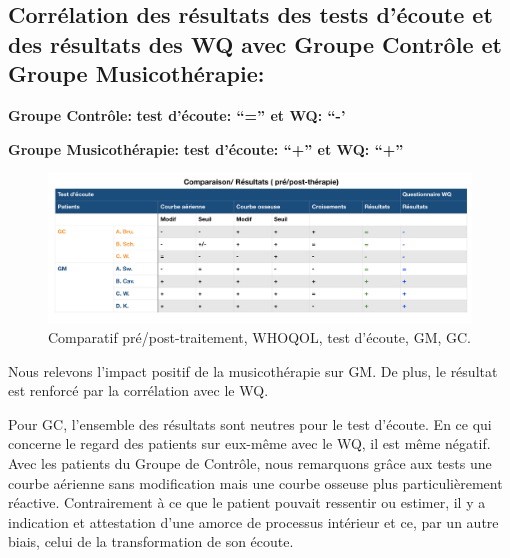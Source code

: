   \subsection{Corrélation des résultats des tests d'écoute et des
    résultats des WQ avec Groupe Contrôle et
    Groupe Musicothérapie:}
\textbf{Groupe Contrôle:} 	          \textbf{ test d'écoute: ``=''   et    WQ: ``-'}

 
\textbf{Groupe Musicothérapie:}     \textbf{test d'écoute: ``+''      et    WQ: ``+''}


 \begin{figure}[th]
\centering
\includegraphics[width=1\linewidth]{images/graphiques/comparaison_pre_post.png}
\caption[Corrélation résultats pré/post]{Comparatif
  pré/post-traitement, WHOQOL, test d'écoute, GM, GC.}
       
\label{comparaison_pre_post}
\end{figure}



                Nous relevons l'impact positif de la
                musicothérapie sur GM.
                De plus, le résultat est renforcé par la corrélation
                avec le WQ.

                
                Pour GC, l'ensemble des résultats sont neutres pour le
                test d'écoute. En ce qui concerne le
                regard des patients sur eux-même avec le WQ, il est
                même négatif. Avec les patients du Groupe de
              Contrôle, nous remarquons grâce aux tests une courbe aérienne
              sans modification mais une courbe osseuse plus
              particulièrement réactive. Contrairement à
              ce que le patient pouvait ressentir ou estimer, il y a indication  et attestation d'une amorce de
              processus intérieur et ce, par un autre biais, celui de
              la transformation de son 
              écoute.
              
